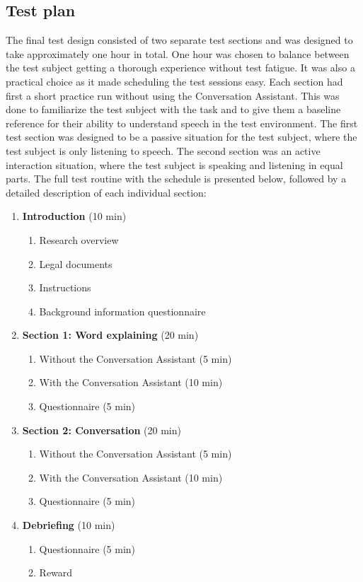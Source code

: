 \documentclass[english, 12pt, a4paper, pdftex, elec, utf8]{aaltothesis}
\begin{document}
\subsection{Test plan} \label{sec:testplan}

The final test design consisted of two separate test sections and was designed to take approximately one hour in total. One hour was chosen to balance between the test subject getting a thorough experience without test fatigue. It was also a practical choice as it made scheduling the test sessions easy. Each section had first a short practice run without using the Conversation Assistant. This was done to familiarize the test subject with the task and to give them a baseline reference for their ability to understand speech in the test environment. The first test section was designed to be a passive situation for the test subject, where the test subject is only listening to speech. The second section was an active interaction situation, where the test subject is speaking and listening in equal parts. The full test routine with the schedule is presented below, followed by a detailed description of each individual section:
\vspace{2mm}
\begin{enumerate}[font=\bfseries]
    \item \textbf{Introduction} (10 min)
    \begin{enumerate}[label*=\arabic*.]
        \item Research overview
        \item Legal documents
        \item Instructions
        \item Background information questionnaire
    \end{enumerate}
    \item \textbf{Section 1: Word explaining} (20 min)
    \begin{enumerate}[label*=\arabic*.]
        \item Without the Conversation Assistant (5 min)
        \item With the Conversation Assistant (10 min)
        \item Questionnaire (5 min)
    \end{enumerate}
    \item \textbf{Section 2: Conversation} (20 min)
    \begin{enumerate}[label*=\arabic*.]
        \item Without the Conversation Assistant (5 min)
        \item With the Conversation Assistant (10 min)
        \item Questionnaire (5 min)
    \end{enumerate}
    \item \textbf{Debriefing} (10 min)
    \begin{enumerate}[label*=\arabic*.]
        \item Questionnaire (5 min)
        \item Reward \\
    \end{enumerate}
\end{enumerate}
\end{document}
